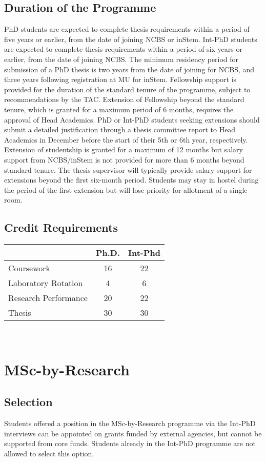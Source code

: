 \documentclass[a4paper,10pt]{article}
\begin{document}
\subsection{Duration of the Programme}
PhD students are expected to complete thesis requirements within a period of
five years or earlier, from the date of joining NCBS or inStem. Int-PhD students
are expected to complete thesis requirements within a period of six years or
earlier, from the date of joining NCBS. The minimum residency period for
submission of a PhD thesis is two years from the date of joining for NCBS, and
three years following registration at MU for inStem. Fellowship support is
provided for the duration of the standard tenure of the programme, subject to
recommendations by the TAC. Extension of Fellowship beyond the standard tenure,
which is granted for a maximum period of 6 months, requires the approval of Head
Academics. PhD or Int-PhD students seeking extensions should submit a detailed
justification through a thesis committee report to Head Academics in December
before the start of their 5th or 6th year, respectively. Extension of
studentship is granted for a maximum of 12 months but salary support from
NCBS/inStem is not provided for more than 6 months beyond standard tenure. The
thesis supervisor will typically provide salary support for extensions beyond
the first six-month period. Students may stay in hostel during the period of the
first extension but will lose priority for allotment of a single room. 

\subsection{ Credit Requirements}

\begin{tabular}{l c c}
         & Ph.D. & Int-Phd \\
    \toprule
    Coursework & 16 & 22 \\
    Laboratory Rotation & 4 & 6 \\
    Research Performance & 20 & 22 \\
    Thesis & 30 & 30  \\
    \bottomrule
\end{tabular}
  
\section{MSc-by-Research}

\subsection{Selection}
Students offered a position in the MSc-by-Research programme via the Int-PhD
interviews can be appointed on grants funded by external agencies, but cannot be supported
from core funds. Students already in the Int-PhD programme are not allowed to select this
option.
\end{document}
